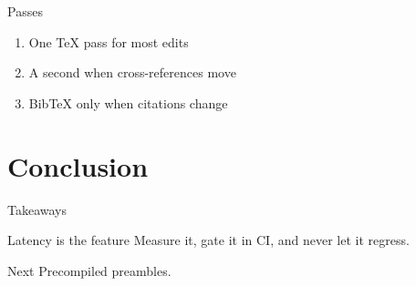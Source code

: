 \documentclass[aspectratio=169]{beamer}
\begin{document}
\begin{frame}{Passes}
  \begin{enumerate}
    \item<1-> One TeX pass for most edits
    \item<2-> A second when cross-references move
    \item<3-> BibTeX only when citations change
  \end{enumerate}
\end{frame}

\section{Conclusion}

\begin{frame}{Takeaways}
  \begin{alertblock}{Latency is the feature}
    Measure it, gate it in CI, and never let it regress.
  \end{alertblock}
  \begin{exampleblock}{Next}
    Precompiled preambles.
  \end{exampleblock}
\end{frame}
\end{document}
